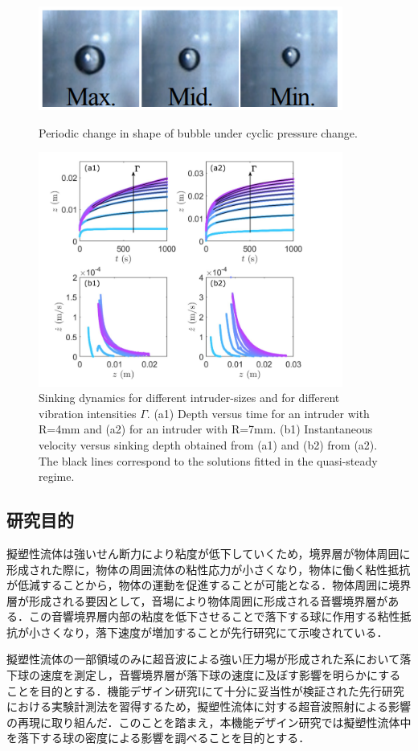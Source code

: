 \begin{center}
    \begin{figure}[h]
        \centering
        \includegraphics[width=10.0cm,clip]{1-Background/3-bubble.png}
        \caption{Periodic change in shape of bubble under cyclic pressure change\cite{ref:5}.}
        \label{fig:3-bubble}
        \centering
        \includegraphics[width=10.0cm,clip]{1-Background/4-sinking.png}
        \caption{Sinking dynamics for different intruder-sizes and for different vibration intensities $\Gamma$. (a1) Depth versus time for an intruder with R=4mm and (a2) for an intruder with R=7mm. (b1) Instantaneous velocity versus sinking depth obtained from (a1) and (b2) from (a2). The black lines correspond to the solutions fitted in the quasi-steady regime\cite{ref:6}.}
        \label{fig:4-sinking}
    \end{figure}
\end{center}

\subsection{研究目的}
擬塑性流体は強いせん断力により粘度が低下していくため，境界層が物体周囲に形成された際に，物体の周囲流体の粘性応力が小さくなり，物体に働く粘性抵抗が低減することから，物体の運動を促進することが可能となる．物体周囲に境界層が形成される要因として，音場により物体周囲に形成される音響境界層がある\cite{ref:7}．この音響境界層内部の粘度を低下させることで落下する球に作用する粘性抵抗が小さくなり，落下速度が増加することが先行研究\cite{ref:8}にて示唆されている．

擬塑性流体の一部領域のみに超音波による強い圧力場が形成された系において落下球の速度を測定し，音響境界層が落下球の速度に及ぼす影響を明らかにすることを目的とする．機能デザイン研究Iにて十分に妥当性が検証された先行研究における実験計測法を習得するため，擬塑性流体に対する超音波照射による影響の再現に取り組んだ．このことを踏まえ，本機能デザイン研究では擬塑性流体中を落下する球の密度による影響を調べることを目的とする．
